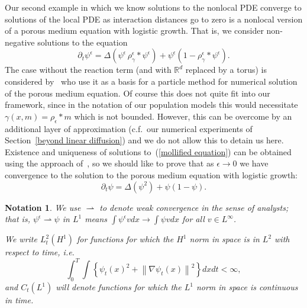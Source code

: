 \documentclass[12pt]{article}
\newtheorem{notation}[theorem]{Notation}
\newcommand{\IR}{\mathbb R}
\newcommand{\kernel}{\rho}  %
\newcommand{\smooth}[1]{\kernel_{#1} \! * \!}  %
\numberwithin{equation}{section}
\begin{document}
Our second example 
in which we know solutions to the nonlocal PDE converge to
solutions of the local PDE as interaction distances go to zero
is a nonlocal version of a porous medium equation with logistic growth.
That is, we consider non-negative solutions to the equation
\begin{equation}
\label{mollified equation}
\partial_t \psi^\epsilon=
\Delta\left(\psi^\epsilon \, \rho^{\epsilon}_\gamma*\psi^\epsilon\right)
+\psi^\epsilon\left(1-\rho^{\epsilon}_\gamma*\psi^\epsilon\right).
\end{equation}
The case without the reaction term (and with $\IR^d$ replaced by a torus) is considered 
by~\cite{lions/mas-gallic:2001} who use
it as a basis for a particle method for numerical solution of the porous medium equation.
Of course this does not quite fit into our framework, since in the notation of our 
population models this would necessitate $\gamma(x,m)=\smooth{\epsilon}m$ which is
not bounded. However, this can be overcome by an additional layer of approximation
(c.f.~our numerical experiments of Section~\ref{beyond linear diffusion})
and we do not allow this to detain us here. Existence and uniqueness of solutions 
to~(\ref{mollified equation}) can be obtained using the approach
of~\cite{lions/mas-gallic:2001}, so
we should like to prove that as $\epsilon\to 0$ we have
convergence to the solution to the porous medium equation with
logistic growth:
\begin{equation}
\label{PME}
\partial_t\psi=
\Delta\left(\psi^2\right)
+\psi\left(1-\psi\right).
\end{equation}

\begin{notation}
We use $\rightharpoonup$ to denote weak convergence in the sense of analysts;
that is, $\psi^\epsilon\rightharpoonup \psi$ in $L^1$ means 
$\int \psi^\epsilon v d x
\rightarrow\int \psi v d x$ for all $v\in L^\infty$.

We write $L_t^2(H^1)$ for functions for which the $H^1$ norm in
space is in $L^2$ with respect to time, i.e.
$$\int_0^T\int \left\{\psi_t(x)^2+\left\| \nabla \psi_t(x)\right\|^2\right\}
dx dt <\infty,$$
and $C_t(L^1)$
will denote functions for which the $L^1$ norm in space is continuous in time.
\end{notation}
\end{document}
